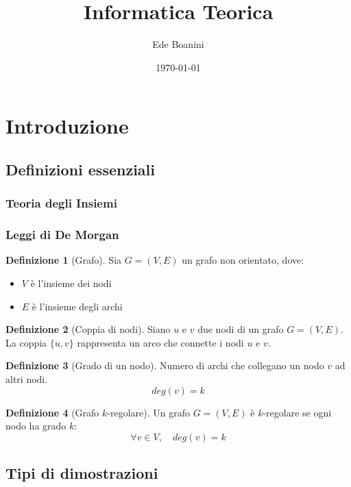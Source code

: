 \documentclass{article}  %
\title{Informatica Teorica}
\author{Ede Boanini}
\date{\today}
\theoremstyle{definition}
\newtheorem{definition}{Definizione}[section]
\begin{document}
\maketitle
\tableofcontents %
\newpage
\section{Introduzione}
\subsection{Definizioni essenziali}
\subsubsection{Teoria degli Insiemi} 
\break
\subsubsection{Leggi di De Morgan} 
\break
\begin{definition}[Grafo]
	Sia \(G=(V,E)\) un grafo non orientato, dove:
	\begin{itemize}
		\item \(V\) è l'insieme dei nodi
		\item \(E\) è l'insieme degli archi
	\end{itemize}
\end{definition}
\begin{definition}[Coppia di nodi]
	Siano \(u\) e \(v\) due nodi di un grafo \(G = (V,E)\).
	La coppia \(\{u,v\}\) rappresenta un arco che connette i nodi \(u\) e \(v\).
\end{definition}
\begin{definition}[Grado di un nodo]
	Numero di archi che collegano un nodo $v$ ad altri nodi.
	\[
		deg(v)=k
	\]
\end{definition}
\begin{definition}[Grafo $k$-regolare]
	Un grafo \(G=(V,E)\) è $k$-regolare se ogni nodo ha grado $k$:
	\[
		\forall v \in V, \quad deg(v)=k
	\]
\end{definition}
\subsection{Tipi di dimostrazioni}
\end{document}
